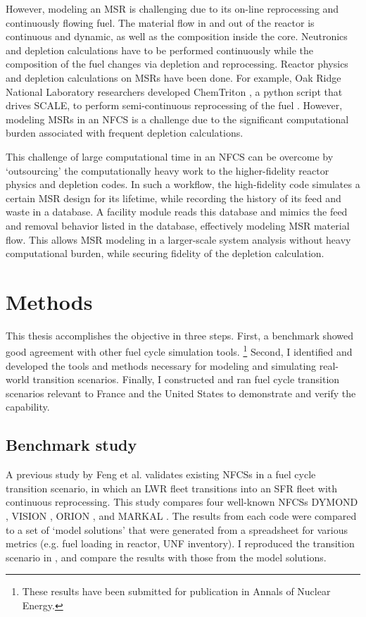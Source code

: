 However, modeling an \gls{MSR} is challenging due to its on-line reprocessing
and continuously flowing fuel.
The material flow in and out of the reactor is continuous and dynamic, as well as the
composition inside the core.
Neutronics and depletion calculations have to be performed continuously while
the composition of the fuel changes via depletion and reprocessing.
Reactor physics and depletion calculations
on \glspl{MSR} have been done. For example,
Oak Ridge National Laboratory researchers developed
ChemTriton \cite{powers_new_2013}, a python script that drives SCALE,
to perform semi-continuous reprocessing of the fuel \cite{powers_inventory_2014, betzler_fuel_2018}.
However, modeling \glspl{MSR} in an \gls{NFCS} is a challenge
due to the significant computational burden associated with frequent depletion calculations.

This challenge of large computational time in an \gls{NFCS} can be overcome by `outsourcing' the computationally
heavy work to the higher-fidelity reactor physics and depletion codes. 
In such a workflow, the high-fidelity code simulates a certain
\gls{MSR} design for its lifetime, while recording the history of its feed and waste in a
database. A \Cyclus facility module reads this database and mimics the feed and removal
behavior listed in the database, effectively modeling \gls{MSR} material flow.
This allows \gls{MSR} modeling in a larger-scale system analysis without heavy computational
burden, while securing fidelity of the depletion calculation.



\section{Methods}
This thesis accomplishes the objective in three steps. 
First, a benchmark showed good agreement with other
fuel cycle simulation tools. \footnote{These results have been
submitted for publication in Annals of Nuclear Energy.}
Second, I identified and developed the tools and methods necessary
for modeling and simulating real-world transition scenarios.
Finally, I constructed and ran fuel cycle transition scenarios
relevant to France and the United States to demonstrate
and verify the capability.

\subsection{Benchmark study}
A previous study by Feng et al. \cite{feng_standardized_2016} validates existing 
\glspl{NFCS} in a fuel cycle transition scenario, in which an \gls{LWR} fleet
transitions into an \gls{SFR} fleet with continuous reprocessing. This 
study compares four well-known \glspl{NFCS}
DYMOND \cite{yacout_modeling_2005},
VISION \cite{jacobson_verifiable_2010},
ORION \cite{gregg_analysis_2012}, and
MARKAL \cite{shay_epa_2006}. The results from each code were
compared to a set of `model solutions' that were generated
from a spreadsheet for various metrics (e.g. fuel loading
in reactor, \gls{UNF} inventory). I reproduced the transition
scenario in \Cyclus, and compare the \Cyclus results with those
from the model solutions.

